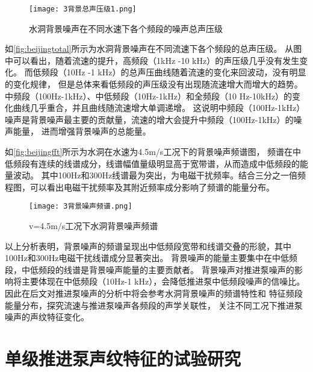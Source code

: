 \begin{figure}[htbp]
    \centering
    \texttt{[image: 3背景总声压级1.png]}
    \caption{\label{fig:beijingtotal}水洞背景噪声在不同水速下各个频段的噪声总声压级}
\end{figure}

如\autoref{fig:beijingtotal}所示为水洞背景噪声在不同流速下各个频段的总声压级。
从图中可以看出，随着流速的提升，高频段（1kHz -10 kHz）的声压级几乎没有发生变化。
而低频段（10Hz -1 kHz）的总声压曲线随着流速的变化来回波动，没有明显的变化规律，
但是总体来看低频段的声压级没有出现随流速增大而增大的趋势。
中频段（100Hz-1kHz）、中低频段（10Hz-1kHz）和全频段（10 Hz-10kHz）的变化曲线几乎重合，并且曲线随流速增大单调递增。
这说明中频段（100Hz-1kHz）噪声是背景噪声最主要的贡献量，流速的增大会提升中频段（100Hz-1kHz）的噪声能量，
进而增强背景噪声的总能量。

如\autoref{fig:beijingfft}所示为水洞在水速为4.5m/s工况下的背景噪声频谱图，
频谱在中低频段有连续的线谱成分，线谱幅值量级明显高于宽带谱，从而造成中低频段的能量波动。
其中100Hz和300Hz线谱最为突出，为电磁干扰频率。结合三分之一倍频程图，可以看出电磁干扰频率及其附近频率成分影响了频谱的能量分布。

\begin{figure}[htbp]
    \centering
    \texttt{[image: 3背景噪声频谱.png]}
    \caption{\label{fig:beijingfft}v=4.5m/s工况下水洞背景噪声频谱}
\end{figure}

以上分析表明，背景噪声的频谱呈现出中低频段宽带和线谱交叠的形貌，其中100Hz和300Hz电磁干扰线谱成分显著突出。
背景噪声的能量主要集中在中低频段，中低频段的线谱是背景噪声能量的主要贡献者。
背景噪声对推进泵噪声的影响将主要体现在中低频段（10Hz-1 kHz），会降低推进泵中低频段噪声的信噪比。
因此在后文对推进泵噪声的分析中将会参考水洞背景噪声的频谱特性和
特征频段能量分布，探究流速与推进泵噪声各频段的声学关联性，
关注不同工况下推进泵噪声的声纹特征变化。
\section{单级推进泵声纹特征的试验研究}
